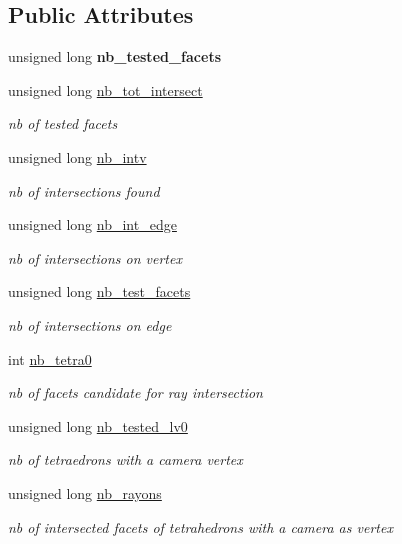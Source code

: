 \subsection*{Public Attributes}
\begin{DoxyCompactItemize}
\item 
\hypertarget{classTrStats_a87a12908493a4065111d0c77ff009678}{
unsigned long {\bfseries nb\_\-tested\_\-facets}}
\label{classTrStats_a87a12908493a4065111d0c77ff009678}

\item 
unsigned long \hyperlink{classTrStats_a3d4033d7f4886cfb82d941e21897acce}{nb\_\-tot\_\-intersect}
\begin{DoxyCompactList}\small\item\em nb of tested facets \item\end{DoxyCompactList}\item 
unsigned long \hyperlink{classTrStats_aa4d9812c2ef74f9d86b4b5cc50b9766d}{nb\_\-intv}
\begin{DoxyCompactList}\small\item\em nb of intersections found \item\end{DoxyCompactList}\item 
unsigned long \hyperlink{classTrStats_a95aed605db899b514028a615f6ed444f}{nb\_\-int\_\-edge}
\begin{DoxyCompactList}\small\item\em nb of intersections on vertex \item\end{DoxyCompactList}\item 
unsigned long \hyperlink{classTrStats_aa6d678657deb3ddb2723ef804ca3c7c6}{nb\_\-test\_\-facets}
\begin{DoxyCompactList}\small\item\em nb of intersections on edge \item\end{DoxyCompactList}\item 
int \hyperlink{classTrStats_a50445249236e80915c7d3cc9556c53b5}{nb\_\-tetra0}
\begin{DoxyCompactList}\small\item\em nb of facets candidate for ray intersection \item\end{DoxyCompactList}\item 
unsigned long \hyperlink{classTrStats_a0f7b2ad9c9363b68608cbcec16c82af3}{nb\_\-tested\_\-lv0}
\begin{DoxyCompactList}\small\item\em nb of tetraedrons with a camera vertex \item\end{DoxyCompactList}\item 
unsigned long \hyperlink{classTrStats_a8bdc211d4e6e25d9f1c0c00a7d35faf9}{nb\_\-rayons}
\begin{DoxyCompactList}\small\item\em nb of intersected facets of tetrahedrons with a camera as vertex \item\end{DoxyCompactList}\end{DoxyCompactItemize}


